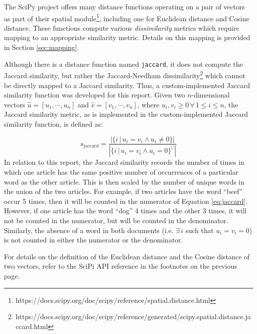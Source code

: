 \documentclass[11pt]{article}
\begin{document}
The SciPy project \cite{scipy} offers many distance functions operating on a pair of vectors as part of their spatial module\footnote{
https://docs.scipy.org/doc/scipy/reference/spatial.distance.html
}, including one for Euclidean distance %
and Cosine distance. %
These functions compute various \emph{dissimilarity} metrics which require mapping to an appropriate similarity metric.
Details on this mapping is provided in Section \ref{sec:mapping}. 

Although there is a distance function named \texttt{jaccard}, it does not compute the Jaccard similarity, but rather the Jaccard-Needham dissimilarity\footnote{
https://docs.scipy.org/doc/scipy/reference/generated/scipy.spatial.distance.jaccard.html
} which cannot be directly mapped to a Jaccard similarity.
Thus, a custom-implemented Jaccard similarity function was developed for this report.
Given two $n$-dimensional vectors $\hat{u} = [ u_1, \cdots, u_n ]$ and $\hat{v} = [ v_1, \cdots, v_n ]$, where $u_i, v_i \ge 0 \, \forall \, 1 \le i \le n$, the Jaccard similarity metric, as is implemented in the custom-implemented Jaccard similarity function, is defined as:

\begin{equation} \label{eq:jaccard}
	s_{\text{jaccard}} = \frac{ \left| \{i \, | \, u_i = v_i \land u_i \ne 0 \} \right| }
	                          { \left| \{i \, | \, u_i = v_i \land u_i = 0 \}^\complement \right| }
\end{equation}
In relation to this report, the Jaccard similarity records the number of times in which one article has the same positive number of occurrences of a particular word as the other article.
This is then scaled by the number of unique words in the union of the two articles. For example, if two articles have the word ``beef'' occur 5 times, then it will be counted in the numerator of Equation \ref{eq:jaccard}.
However, if one article has the word ``dog'' 4 times and the other 3 times, it will not be counted in the numerator, but will be counted in the denominator.
Similarly, the absence of a word in both documents (i.e. $\exists \, i$ such that $u_i = v_i = 0$) is not counted in either the numerator or the denominator.

For details on the definition of the Euclidean distance and the Cosine distance of two vectors, refer to the SciPi API reference in the footnotes on the previous page.
\end{document}
